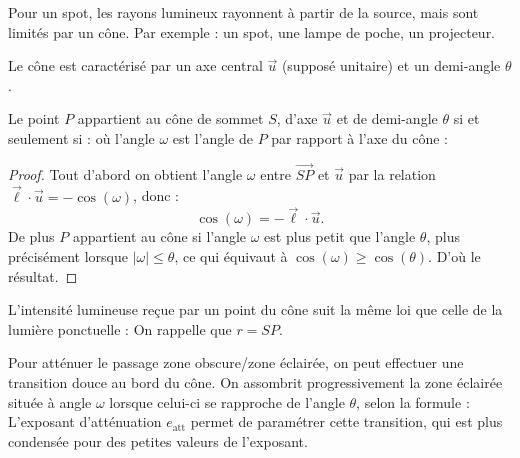 \documentclass[11pt,class=report,crop=false]{standalone}
\begin{document}
Pour un spot, les rayons lumineux rayonnent à partir de la source, mais sont limités par un cône.  Par exemple : un spot, une lampe de poche, un projecteur.


Le cône est caractérisé par un axe central $\vec u$ (supposé unitaire) et un demi-angle $\theta$.


\begin{proposition}
Le point $P$ appartient au cône de sommet $S$, d'axe $\vec u$ et de demi-angle $\theta$ si et seulement si :
\mybox{$\displaystyle \cos(\omega) \ge \cos(\theta)$}
où l'angle $\omega$ est l'angle de $P$ par rapport à l'axe du cône :
\end{proposition}


\begin{proof}
Tout d'abord on obtient l'angle $\omega$ entre $\overrightarrow{SP}$ et $\vec u$ par la relation $\vec \ell \cdot \vec u = - \cos(\omega)$, donc :
$$\cos(\omega) = -\vec \ell \cdot \vec u.$$
De plus $P$ appartient au cône si l'angle $\omega$ est plus petit que l'angle $\theta$, plus précisément lorsque $|\omega| \le \theta$, ce qui équivaut à $\cos(\omega) \ge \cos(\theta)$. D'où le résultat.
\end{proof}

L'intensité lumineuse reçue par un point du cône suit la même loi que celle de la lumière ponctuelle :
On rappelle que $r = SP$.




Pour atténuer le passage zone obscure/zone éclairée, on peut effectuer une transition douce au bord du cône. On assombrit  progressivement la zone éclairée située à angle $\omega$ lorsque celui-ci se rapproche de l'angle $\theta$, selon la formule :
L'exposant d'atténuation $e_\text{att}$ permet de paramétrer cette transition, qui est plus condensée pour des petites valeurs de l'exposant.
\end{document}
